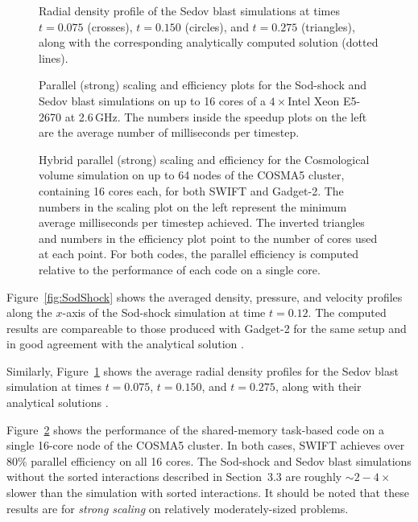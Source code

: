 \documentclass[final]{siamltex}
\newcommand{\fig}[1]
    {Figure~\ref{fig:#1}}
\begin{document}
\begin{figure}
    \centerline{}
    \caption{Radial density profile of the Sedov blast simulations at
        times $t=0.075$ (crosses), $t=0.150$ (circles), and $t=0.275$
        (triangles), along with the corresponding analytically computed solution
        (dotted lines).}
    \label{fig:SedovBlast}
\end{figure}

\begin{figure}
    \centerline{}
    \centerline{}
    \caption{Parallel (strong) scaling and efficiency plots for the Sod-shock and
        Sedov blast simulations on up to 16 cores of a $4\times$Intel Xeon E5-2670
        at 2.6\,GHz. The numbers inside the speedup plots on the left are
        the average number of milliseconds per timestep.}
    \label{fig:Scaling}
\end{figure}

\begin{figure}
    \centerline{}
    \caption{Hybrid parallel (strong) scaling and efficiency for the
        Cosmological volume simulation on up to 64 nodes of the COSMA5
        cluster, containing 16 cores each, for both SWIFT and Gadget-2.
        The numbers in the scaling plot on the left represent the minimum
        average milliseconds per timestep achieved.
        The inverted triangles and numbers in the efficiency plot point to
        the number of cores used at each point.
        For both codes, the parallel efficiency is computed relative to
        the performance of each code on a single core.}
    \label{fig:CosmoVolume}
\end{figure}


\fig{SodShock} shows the averaged density, pressure, and velocity profiles
along the $x$-axis of the Sod-shock simulation at time $t=0.12$.
The computed results are compareable to those produced with Gadget-2 for
the same setup and in good agreement with the analytical solution
\cite{ref:Sod1978}.

Similarly, \fig{SedovBlast} shows the average radial density profiles
for the Sedov blast simulation at times $t=0.075$, $t=0.150$, and $t=0.275$,
along with their analytical solutions \cite{ref:Sedov1959}.

\fig{Scaling} shows the performance of the shared-memory task-based 
code on a single 16-core node of the COSMA5 cluster.
In both cases, SWIFT achieves over 80\% parallel efficiency on all
16 cores.
The Sod-shock and Sedov blast simulations without the sorted
interactions described
in Section~3.3 are roughly $\sim 2-4\times$ slower than the simulation
with sorted interactions.
It should be noted that these results are for {\em strong scaling}
on relatively moderately-sized problems.
\end{document}
